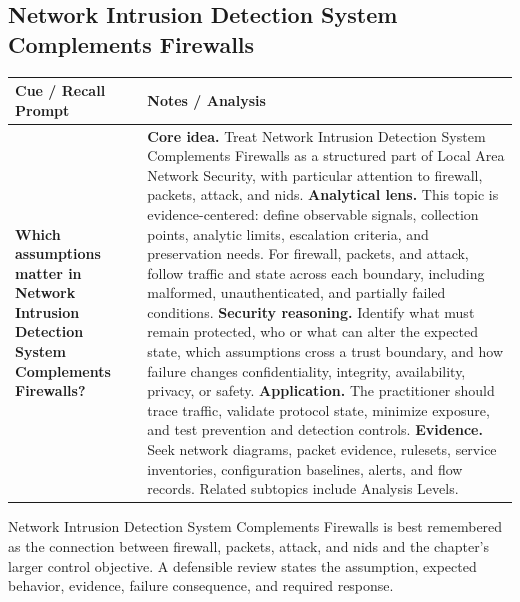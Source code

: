 \documentclass[11pt]{article}
\newcommand{\CornellHeader}{%
\rowcolor{Navy}\color{white}\bfseries Cue / Recall Prompt & \color{white}\bfseries Notes / Analysis\\\hline}
\newcommand{\CornellRow}[2]{%
\cellcolor{CueGray}\RaggedRight\textbf{#1} & \RaggedRight #2\\\hline}
\begin{document}
\subsection*{Network Intrusion Detection System Complements Firewalls}
\begin{longtable}{>{\RaggedRight\arraybackslash}p{}|>{\RaggedRight\arraybackslash}p{}}
\CornellHeader
\CornellRow{Which assumptions matter in Network Intrusion Detection System Complements Firewalls?}{\textbf{Core idea.} Treat Network Intrusion Detection System Complements Firewalls as a structured part of Local Area Network Security, with particular attention to firewall, packets, attack, and nids. \textbf{Analytical lens.} This topic is evidence-centered: define observable signals, collection points, analytic limits, escalation criteria, and preservation needs. For firewall, packets, and attack, follow traffic and state across each boundary, including malformed, unauthenticated, and partially failed conditions. \textbf{Security reasoning.} Identify what must remain protected, who or what can alter the expected state, which assumptions cross a trust boundary, and how failure changes confidentiality, integrity, availability, privacy, or safety. \textbf{Application.} The practitioner should trace traffic, validate protocol state, minimize exposure, and test prevention and detection controls. \textbf{Evidence.} Seek network diagrams, packet evidence, rulesets, service inventories, configuration baselines, alerts, and flow records. Related subtopics include Analysis Levels.}
\end{longtable}
\begin{topicsummary}
Network Intrusion Detection System Complements Firewalls is best remembered as the connection between firewall, packets, attack, and nids and the chapter's larger control objective. A defensible review states the assumption, expected behavior, evidence, failure consequence, and required response.
\end{topicsummary}
\end{document}

